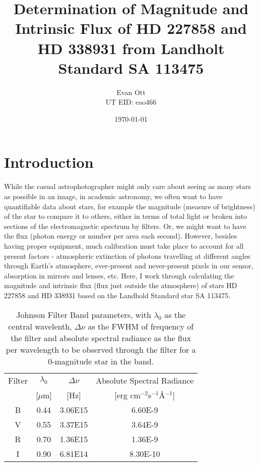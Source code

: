 \documentclass{article}
\title{Determination of Magnitude and Intrinsic Flux of HD 227858 and HD 338931 from Landholt Standard SA 113475}
\author{Evan Ott \\ UT EID: eao466}
\date{\today}
\begin{document}
\maketitle
\section{Introduction}
While the casual astrophotographer might only care about seeing as many stars as possible in an image, in academic astronomy,
we often want to have quantifiable data about stars, for example the magnitude (measure of brightness) of the star to compare it
to others, either in terms of total light or broken into sections of the electromagnetic spectrum by filters. Or, we might want to
have the flux (photon energy or number per area each second). However, besides having proper equipment, much calibration
must take place to account for all present factors - atmospheric extinction of photons travelling at different angles
through Earth's atmosphere, ever-present and never-present pixels in our sensor, absorption in mirrors and lenses, etc. Here, I work through calculating the magnitude and intrinsic flux (flux just outside the atmosphere) of stars HD 227858
and HD 338931 based on the Landhold Standard star SA 113475{\huge\cite{lanholt}}. 

\begin{table}
\begin{center}
\begin{tabular}{c | c | c | c}
Filter & $\lambda_0$ & $\Delta\nu$ & Absolute Spectral Radiance  \\
 & [$\mu$m]& [Hz]& [erg cm$^{-2}$s$^{-1}$\AA$^{-1}$] \\
\hline
B & 0.44 & 3.06E15 & 6.60E-9 \\
V & 0.55& 3.37E15 &3.64E-9 \\
R & 0.70& 1.36E15 &1.36E-9 \\
I & 0.90& 6.81E14&8.30E-10
\end{tabular}
\end{center}
\caption{Johnson Filter Band parameters, with $\lambda_0$ as the central wavelenth,
$\Delta\nu$ as the FWHM of frequency of the filter and absolute spectral radiance as the
flux per wavelength to be observed through the filter for a 0-magnitude star in the band.}
\label{table:filters}
\end{table}
\end{document}
